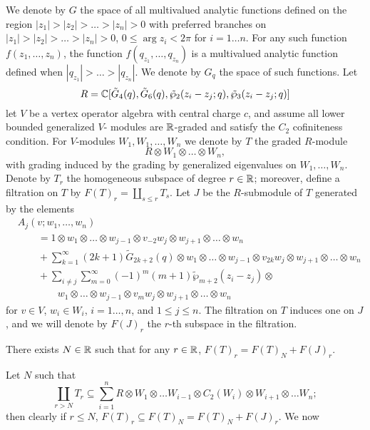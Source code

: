 \documentclass[12pt]{article}
\begin{document}
We denote by $G$ the space of all multivalued analytic functions defined
on the region $|z_1|>|z_2|>\ldots > |z_n| > 0$ with preferred branches on
$|z_1|>|z_2|>\ldots > |z_n| > 0$, $0\leq \arg z_i < 2\pi$ for
$i=1\ldots n$. For any such function $f(z_1,\ldots,z_n)$, the function
$f(q_{z_1}, \ldots, q_{z_n})$ is a multivalued analytic function
defined when $|q_{z_1}| > \ldots > |q_{z_n}|$.
We denote by $G_q$ the space of such functions.
Let 
$$R = \mathbb{C}[\tilde G_4(q), \tilde G_6(q), \tilde \wp_2(z_i-z_j;q), \tilde \wp_3(z_i-z_j;q)]$$
let $V$ be a vertex operator algebra with central charge $c$,
and assume all lower bounded generalized $V$-
modules are $\mathbb{R}$-graded and satisfy the $C_2$ cofiniteness condition.
For $V$-modules $W_1, W_1, \ldots, W_n$ we denote by $T$ the graded $R$-module
$$
  R\otimes W_1 \otimes \ldots \otimes W_n,
$$
with grading induced by the grading by generalized eigenvalues on $W_1,\ldots, W_n$.
Denote by $T_r$ the homogeneous subspace of degree $r\in \mathbb{R}$; moreover, define a
filtration on $T$ by $F(T)_r = \coprod_{s\leq r} T_s$.
Let $J$ be the $R$-submodule of $T$ generated by the elements
\begin{align*}
  &A_j(v; w_1, \ldots, w_n)\\
  &\qquad = 1\otimes w_1\otimes\ldots\otimes w_{j-1}\otimes v_{-2}w_j\otimes
    w_{j+1}\otimes\ldots\otimes w_n\\
  &\qquad + \sum_{k=1}^\infty (2k+1)\tilde G_{2k+2}(q)\otimes
    w_1\otimes\ldots\otimes w_{j-1}\otimes v_{2k}w_j\otimes
    w_{j+1}\otimes\ldots\otimes w_n\\
  &\qquad + \sum_{i\neq j}\sum_{m=0}^\infty (-1)^m(m+1)
    \tilde \wp_{m+2}(z_i - z_j)\otimes\\
  &\qquad \qquad w_1\otimes\ldots\otimes w_{j-1}\otimes v_{m}w_j\otimes
    w_{j+1}\otimes\ldots\otimes w_n
\end{align*}
for $v\in V$, $w_i\in W_i$, $i=1\ldots,n$, and $1\leq j \leq n$. The filtration
on $T$ induces one on $J$, and we will denote by $F(J)_r$ the $r$-th subspace in
the filtration.
\begin{prop}\label{pp}
  There exists $N\in \mathbb{R}$ such that for any $r\in \mathbb{R}$, $F(T)_r = F(T)_N + F(J)_r$.
\end{prop}
\proof
  Let $N$ such that
  \begin{equation*}
    \coprod_{r>N} T_r \subseteq \sum_{i=1}^n
      R\otimes W_1\otimes\ldots
        W_{i-1}\otimes C_2(W_i)\otimes W_{i+1}\otimes\ldots W_n;
  \end{equation*}
  then clearly if $r\leq N$, $F(T)_r \subseteq F(T)_N = F(T)_N + F(J)_r$. We now
\end{document}
